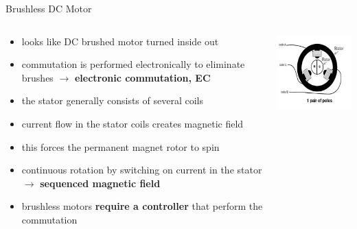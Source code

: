 \documentclass[compress]{beamer}
\begin{document}
\begin{frame}{Brushless DC Motor}

    \begin{columns}
        \begin{column}{0.7\linewidth}
\begin{itemize}
\small
\item looks like DC brushed motor turned inside out
\item commutation is performed electronically  to
  eliminate brushes $\rightarrow$ \textbf{electronic commutation, EC}
\item the stator generally consists of several coils
\item current flow in the stator coils creates magnetic field
\item this forces the permanent magnet rotor to spin
\item continuous rotation by switching on current
    in the stator $\rightarrow$ \textbf{sequenced magnetic field}
\item brushless motors \textbf{require a controller} that perform the commutation
\end{itemize}
            
        \end{column}
        \begin{column}{0.3\linewidth}
            \begin{center}
                \includegraphics[width=\linewidth]{../part3/figs/brushless-schematic}
            \end{center}
        \end{column}
    \end{columns}

\end{frame}
\end{document}

